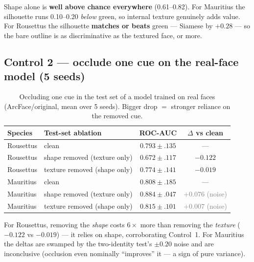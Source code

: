 \documentclass[11pt]{article}
\newcommand{\bd}[1]{\textcolor{poor}{#1}}
\begin{document}
Shape alone is \textbf{well above chance everywhere} (0.61--0.82). For Mauritius the silhouette runs
0.10--0.20 \emph{below} green, so internal texture genuinely adds value. For Rousettus the silhouette
\textbf{matches or beats} green --- Siamese by $+0.28$ --- so the bare outline is as discriminative as
the textured face, or more.

\subsection*{Control 2 --- occlude one cue on the real-face model (5 seeds)}
\begin{table}[h]\centering
\caption{Occluding one cue in the test set of a model trained on real faces (ArcFace/original, mean
over 5 seeds). Bigger drop $=$ stronger reliance on the removed cue.}\label{tab:occl}
\begin{tabular}{ll cc}
\toprule
Species & Test-set ablation & ROC-AUC & $\Delta$ vs clean \\
\midrule
Rousettus & clean & $0.793\pm.135$ & --- \\
Rousettus & shape removed (texture only) & $0.672\pm.117$ & \bd{$-0.122$} \\
Rousettus & texture removed (shape only) & $0.774\pm.141$ & $-0.019$ \\
\addlinespace
Mauritius & clean & $0.808\pm.185$ & --- \\
Mauritius & shape removed (texture only) & $0.884\pm.047$ & \textcolor{gray}{$+0.076$ (noise)} \\
Mauritius & texture removed (shape only) & $0.815\pm.101$ & \textcolor{gray}{$+0.007$ (noise)} \\
\bottomrule
\end{tabular}
\end{table}

For Rousettus, removing the \emph{shape} costs $6\times$ more than removing the \emph{texture}
($-0.122$ vs $-0.019$) --- it relies on shape, corroborating Control~1. For Mauritius the deltas are
swamped by the two-identity test's $\pm0.20$ noise and are inconclusive (occlusion even nominally
``improves'' it --- a sign of pure variance).
\end{document}
